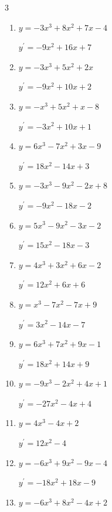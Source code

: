 \begin{multicols}{3}
\begin{enumerate}
        $\displaystyle y^{\prime}=15x^{2}+2$

  \item $y=-3x^{3}+8x^{2}+7x-4$

        $\displaystyle y^{\prime}=-9x^{2}+16x+7$

  \item $y=-3x^{3}+5x^{2}+2x$

        $\displaystyle y^{\prime}=-9x^{2}+10x+2$

\columnbreak %

  \item $y=-x^{3}+5x^{2}+x-8$

        $\displaystyle y^{\prime}=-3x^{2}+10x+1$

  \item $y=6x^{3}-7x^{2}+3x-9$

        $\displaystyle y^{\prime}=18x^{2}-14x+3$

  \item $y=-3x^{3}-9x^{2}-2x+8$

        $\displaystyle y^{\prime}=-9x^{2}-18x-2$

  \item $y=5x^{3}-9x^{2}-3x-2$

        $\displaystyle y^{\prime}=15x^{2}-18x-3$

  \item $y=4x^{3}+3x^{2}+6x-2$

        $\displaystyle y^{\prime}=12x^{2}+6x+6$

  \item $y=x^{3}-7x^{2}-7x+9$

        $\displaystyle y^{\prime}=3x^{2}-14x-7$

  \item $y=6x^{3}+7x^{2}+9x-1$

        $\displaystyle y^{\prime}=18x^{2}+14x+9$

  \item $y=-9x^{3}-2x^{2}+4x+1$

        $\displaystyle y^{\prime}=-27x^{2}-4x+4$

  \item $y=4x^{3}-4x+2$

        $\displaystyle y^{\prime}=12x^{2}-4$

  \item $y=-6x^{3}+9x^{2}-9x-4$

        $\displaystyle y^{\prime}=-18x^{2}+18x-9$

  \item $y=-6x^{3}+8x^{2}-4x+2$


\end{enumerate}
\end{multicols}
